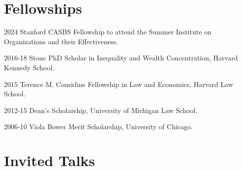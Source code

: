 \documentclass[12pt,letterpaper]{report}
\begin{document}
    \section*{Fellowships}
    
    \begin{tablist}
        \item[2024] \tab{} Stanford CASBS Fellowship to attend the Summer Institute on Organizations and their Effectiveness.
    \item[2016-18] \tab{}Stone PhD Scholar in Inequality and Wealth Concentration, Harvard Kennedy School.
    \item[2015] \tab{}Terence M. Considine Fellowship in Law and Economics, Harvard Law School.
    \item[2012-15] \tab{}Dean's Scholarship, University of Michigan Law School.
    \item[2006-10] \tab{}Viola Bower Merit Scholarship, University of Chicago.
    \end{tablist}

	

    \section*{Invited Talks}
\end{document}
